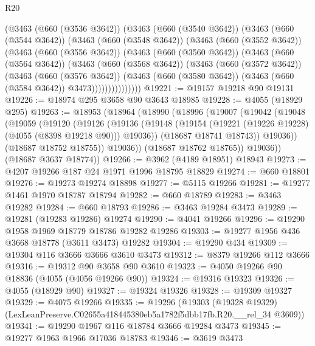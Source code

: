 \begin{lexlean}{R20}
\begin{coremodule}
        (@3463
          (@660 (@3536 @3642))
          (@3463
            (@660 (@3540 @3642))
            (@3463
              (@660 (@3544 @3642))
              (@3463
                (@660 (@3548 @3642))
                (@3463
                  (@660 (@3552 @3642))
                  (@3463
                    (@660 (@3556 @3642))
                    (@3463
                      (@660 (@3560 @3642))
                      (@3463
                        (@660 (@3564 @3642))
                        (@3463
                          (@660 (@3568 @3642))
                          (@3463
                            (@660 (@3572 @3642))
                            (@3463
                              (@660 (@3576 @3642))
                              (@3463
                                (@660 (@3580 @3642))
                                (@3463 (@660 (@3584 @3642)) @3473)))))))))))))))
@19221 := @19157 @19218 @90 @19131
@19226 := @18974 @295 @3658 @90 @3643 @18985
@19228 := @4055 (@18929 @295)
@19263 := @18953
    (@18964
      (@18990
        (@18996
          (@19007
            (@19042
              (@19048
                (@19059
                  (@19120
                    (@19126
                      (@19136
                        (@19148 (@19154 (@19221 (@19226 @19228) (@4055 (@8398 @19218 @90))) @19036))
                        (@18687 @18741 @18743))
                      @19036))
                  (@18687 @18752 @18755))
                @19036))
            (@18687 @18762 @18765))
          @19036))
      (@18687 @3637 @18774))
@19266 := @3962 (@4189 @18951) @18943
@19273 := @4207 @19266 @187 @24 @1971 @1996 @18795 @18829
@19274 := @660 @18801
@19276 := @19273 @19274 @18898
@19277 := @5115 @19266
@19281 := @19277 @1461 @1970 @18787 @18794
@19282 := @660 @18789
@19283 := @3463 @19282
@19284 := @660 @18793
@19286 := @3463 @19284 @3473
@19289 := @19281 (@19283 @19286) @19274
@19290 := @4041 @19266
@19296 := @19290 @1958 @1969 @18779 @18786 @19282 @19286
@19303 := @19277 @1956 @436 @3668 @18778 (@3611 @3473) @19282
@19304 := @19290 @434
@19309 := @19304 @116 @3666 @3666 @3610 @3473
@19312 := @8379 @19266 @112 @3666
@19316 := @19312 @90 @3658 @90 @3610
@19323 := @4050 @19266 @90 @18836 (@4055 (@4056 @19266 @90))
@19324 := @19316 @19323
@19326 := @4055 (@18929 @90)
@19327 := @19324 @19326
@19328 := @19309 @19327
@19329 := @4075 @19266
@19335 := @19296
    (@19303 (@19328 @19329) (LexLeanPreserve.C02655a418445380eb5a1782f5dbb17fb.R20.__rel_34 @3609))
@19341 := @19290 @1967 @116 @18784 @3666 @19284 @3473
@19345 := @19277 @1963 @1966 @17036 @18783
@19346 := @3619 @3473

\end{coremodule}
\end{lexlean}
